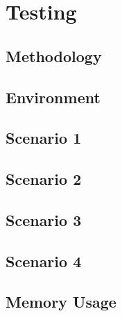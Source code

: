 \chapter{Testing}
\section{Methodology}
\section{Environment}
\section{Scenario 1}
\section{Scenario 2}
\section{Scenario 3}
\section{Scenario 4}
\section{Memory Usage}
